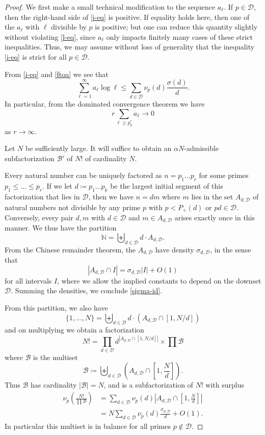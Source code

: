 \documentclass[12pt,a4paper,reqno]{amsart}
\numberwithin{equation}{section}
\theoremstyle{plain}
\theoremstyle{definition}
\newcommand\N{\mathbb{N}}
\newcommand\tuple{{\mathcal B}}
\begin{document}
\begin{proof}  We first make a small technical modification to the sequence $a_\ell$. If $p \in {\mathcal D}$, then the right-hand side of \eqref{i-eq} is positive.  If equality holds here, then one of the $a_\ell$ with $\ell$ divisible by $p$ is positive; but one can reduce this quantity slightly without violating \eqref{l-eq}, since $a_\ell$ only impacts finitely many cases of these strict inequalities.  Thus, we may assume without loss of generality that the inequality \eqref{i-eq} is strict for all $p \in {\mathcal D}$.
 
From \eqref{i-eq} and \eqref{ftoa} we see that
$$ \sum_{\ell=1}^\infty a_\ell \log \ell \leq \sum_{d \in {\mathcal D}} \nu_p(d) \frac{\sigma(d)}{d}.$$
In particular, from the dominated convergence theorem we have
\begin{equation}\label{ar}
r \sum_{\ell \geq p_0^r} a_\ell \to 0
\end{equation}
as $r \to \infty$.

Let $N$ be sufficiently large.  It will suffice to obtain an $\alpha N$-admissible subfactorization $\tuple'$ of $N!$ of cardinality $N$.

Every natural number can be uniquely factored as $n = p_1 \dots p_r$ for some primes $p_1 \leq \dots \leq p_r$.  If we let $d \coloneqq p_1 \dots p_k$ be the largest initial segment of this factorization that lies in ${\mathcal D}$, then we have $n=dm$ where $m$ lies in the set $A_{d,\mathcal{D}}$ of natural numbers not divisible by any prime $p$ with $p < P_+(d)$ or $pd \in \mathcal{D}$.  Conversely, every pair $d,m$ with $d \in {\mathcal D}$ and $m \in A_{d,\mathcal{D}}$ arises exactly once in this manner. We thus have the partition
$$ \N = \biguplus_{d \in {\mathcal D}} d \cdot A_{d,{\mathcal D}}.$$
From the Chinese remainder theorem, the $A_{d,{\mathcal D}}$ have density $\sigma_{d,{\mathcal D}}$, in the sense that
$$ |A_{d,{\mathcal D}} \cap I| = \sigma_{d,{\mathcal D}} |I| + O(1)$$
for all intervals $I$, where we allow the implied constants to depend on the downset ${\mathcal D}$.  Summing the densities, we conclude \eqref{sigma-id}.

From this partition, we also have
$$ \{1,\dots,N\} = \biguplus_{d \in {\mathcal D}} d \cdot (A_{d,{\mathcal D}} \cap [1,N/d])$$
and on multiplying we obtain a factorization
$$ N! = \prod_{d \in {\mathcal D}} d^{|A_{d,{\mathcal D}} \cap [1,N/d]|} \times \prod \tuple$$
where $\tuple$ is the multiset
$$ \tuple \coloneqq \biguplus_{d \in {\mathcal D}} \left(A_{d,{\mathcal D}} \cap \left[1,\frac{N}{d}\right]\right).$$
Thus $\tuple$ has cardinality $|\tuple| = N$, and is a subfactorization of $N!$ with surplus
\begin{equation}\label{p-surplus}
\begin{split}
 \nu_p\left( \frac{N!}{\prod \tuple} \right) &= \sum_{d \in {\mathcal D}} \nu_p(d) \left|A_{d,{\mathcal D}} \cap \left[1,\frac{N}{d}\right]\right| \\
 &= N \sum_{d \in {\mathcal D}} \nu_p(d) \frac{\sigma_{d,{\mathcal D}}}{d} + O(1).
\end{split}
\end{equation}
In particular this multiset is in balance for all primes $p \not \in {\mathcal D}$. 


\end{proof}
\end{document}
